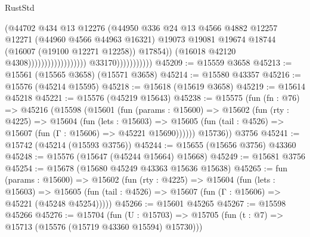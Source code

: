 \begin{lexlean}{RustStd}
\begin{coremodule}
                                                            (@44702
                                                              @434
                                                              @13
                                                              @12276
                                                              (@44950
                                                                @336
                                                                @24
                                                                @13
                                                                @4566
                                                                @4882
                                                                @12257
                                                                @12271
                                                                (@44960 @4566 @44963 @16321)
                                                                @19073
                                                                @19081
                                                                @19674
                                                                @18744
                                                                (@16007 (@19100 @12271 @12258))
                                                                @17854))
                                                            (@16018 @42120 @4308))))))))))))))))))
                          @33170)))))))))))
@45209 := @15559 @3658
@45213 := @15561 (@15565 @3658) (@15571 @3658)
@45214 := @15580 @43357
@45216 := @15576 (@45214 @15595)
@45218 := @15618 (@15619 @3658)
@45219 := @15614 @45218
@45221 := @15576 (@45219 @15643)
@45238 := @15575
    (fun (fn : @76) =>
    @45216
      (@15598
        (@15601
          (fun (params : @15600) =>
          @15602
            (fun (rty : @4225) =>
            @15604
              (fun (lets : @15603) =>
              @15605 (fun (tail : @4526) => @15607 (fun (Γ : @15606) => @45221 @15690))))))
        @15736))
    @3756
@45241 := @15742 (@45214 (@15593 @3756))
@45244 := @15655 (@15656 @3756) @43360
@45248 := @15576 (@15647 (@45244 @15664) @15668)
@45249 := @15681 @3756
@45254 := @15678 (@15680 @45249 @43363 @15636 @15638)
@45265 := fun (params : @15600) =>
  @15602
    (fun (rty : @4225) =>
    @15604
      (fun (lets : @15603) =>
      @15605 (fun (tail : @4526) => @15607 (fun (Γ : @15606) => @45221 (@45248 @45254)))))
@45266 := @15601 @45265
@45267 := @15598 @45266
@45276 := @15704
    (fun (U : @15703) => @15705 (fun (t : @7) => @15713 (@15576 (@15719 @43360 @15594) @15730)))

\end{coremodule}
\end{lexlean}
